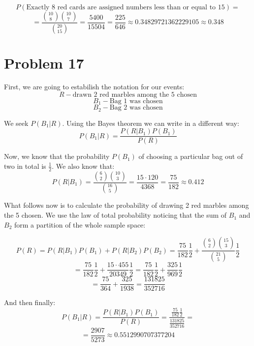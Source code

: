 \documentclass{article}
\begin{document}
\begin{equation*}
    P(\mbox{Exactly 8 red cards are assigned numbers less than or equal to  15}) =
\end{equation*}
\begin{equation*}
    = \frac{\binom{10}{8}\binom{10}{7}}{\binom{20}{15}} = \frac{5400}{15504} = \frac{225}{646} \approx 0.34829721362229105 \approx 0.348
\end{equation*}


\section*{Problem 17}

First, we are going to estabilish the notation for our events:
\begin{equation*}
    R -  \mbox{drawn 2 red marbles among the 5 chosen}
\end{equation*}
\begin{equation*}
    B_1 -  \mbox{Bag 1 was chosen}
\end{equation*}
\begin{equation*}
    B_2 -  \mbox{Bag 2 was chosen}
\end{equation*}


We seek \(P(B_{1} | R)\). Using the Bayes theorem we can write in a different way:
\begin{equation*}
    P(B_{1} | R) = \frac{P(R|B_{1})P(B_{1})}{P(R)}
\end{equation*}

Now, we know that the probability \(P(B_1)\) of choosing a particular bag out of two in total is \(\frac{1}{2}\). We also know that:
\begin{equation*}
    P(R | B_{1}) =  \frac{\binom{6}{2}\binom{10}{3}}{\binom{16}{5}} = \frac{15 \cdot 120}{4368} = \frac{75}{182} \approx 0.412
\end{equation*}

What follows now is to calculate the probability of drawing 2 red marbles among the 5 chosen. We use the law of total probability
noticing that the sum of \(B_1\) and \(B_2\) form a partition of the whole sample space:

\begin{equation*}
    P(R) = P(R|B_1)P(B_1) + P(R | B_2)P(B_2) = \frac{75}{182}\frac{1}{2} + \frac{\binom{6}{2}\binom{15}{3}}{\binom{21}{5}}\frac{1}{2}
\end{equation*}
\begin{equation*}
    = \frac{75}{182}\frac{1}{2} + \frac{15 \cdot 455}{20349}\frac{1}{2} = \frac{75}{182}\frac{1}{2} + \frac{325}{969}\frac{1}{2}
\end{equation*}
\begin{equation*}
    = \frac{75}{364} + \frac{325}{1938} = \frac{131825}{352716}
\end{equation*}

And then finally:
\begin{equation*}
    P(B_{1} | R) = \frac{P(R|B_{1})P(B_{1})}{P(R)} = \frac{\frac{75}{182}\frac{1}{2}}{\frac{131825}{352716}} =
\end{equation*}
\begin{equation*}
    = \frac{2907}{5273} \approx 0.5512990707377204
\end{equation*}
\end{document}
